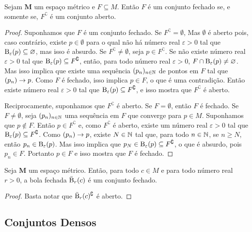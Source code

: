\begin{prop}
Sejam $\bm M$ um espaço métrico e $F \subseteq M$. Então $F$ é um conjunto fechado se, e somente se, $F^\complement$ é um conjunto aberto.
\end{prop}
\begin{proof}
Suponhamos que $F$ é um conjunto fechado. Se $F^\complement = \emptyset$, Mas $\emptyset$ é aberto pois, caso contrário, existe $p \in \emptyset$ para o qual não há número real $\varepsilon > 0$ tal que $\mathrm{B}_\varepsilon(p) \subseteq \varnothing$, mas isso é absurdo. Se $F^\complement \neq \emptyset$, seja $p \in F^\complement$. Se não existe número real $\varepsilon > 0$ tal que $\mathrm{B}_\varepsilon(p) \subseteq F^\complement$, então, para todo número real $\varepsilon > 0$, $F \cap \mathrm{B}_\varepsilon(p) \neq \varnothing$. Mas isso implica que existe uma sequência $(p_n)_{n \in \mathbb{N}}$ de pontos em $F$ tal que $(p_n) \rightarrow p$. Como $F$ é fechado, isso implica $p \in F$, o que é uma contradição. Então existe número real $\varepsilon > 0$ tal que $\mathrm{B}_\varepsilon(p) \subseteq F^\complement$, e isso mostra que $F^\complement$ é aberto.
	
Reciprocamente, suponhamos que $F^\complement$ é aberto. Se $F = \emptyset$, então $F$ é fechado. Se $F \neq \emptyset$, seja $(p_n)_{n \in \mathbb{N}}$ uma sequência em $F$ que converge para $p \in M$. Suponhamos que $p \notin F$. Então $p \in F^\complement$ e, como $F^\complement$ é aberto, existe um número real $\varepsilon > 0$ tal que $\mathrm{B}_\varepsilon(p) \subseteq F^\complement$. Como $(p_n) \rightarrow p$, existe $N \in \mathbb{N}$ tal que, para todo $n \in \mathbb{N}$, se $n \geq N$, então $p_n \in \mathrm{B}_\varepsilon(p)$. Mas isso implica que $p_N \in \mathrm{B}_\varepsilon(p) \subseteq F^\complement$, o que é absurdo, pois $p_n \in F$. Portanto $p \in F$ e isso mostra que $F$ é fechado.
\end{proof}

\begin{prop}
Seja $\bm M$ um espaço métrico. Então, para todo $c \in M$ e para todo número real $r > 0$, a bola fechada $\bar{\mathrm{B}}_r(c)$ é um conjunto fechado.
\end{prop}
\begin{proof}
Basta notar que $\bar{\mathrm{B}}_r(c)^\complement$ é aberto.
\end{proof}

\subsection{Conjuntos Densos}


